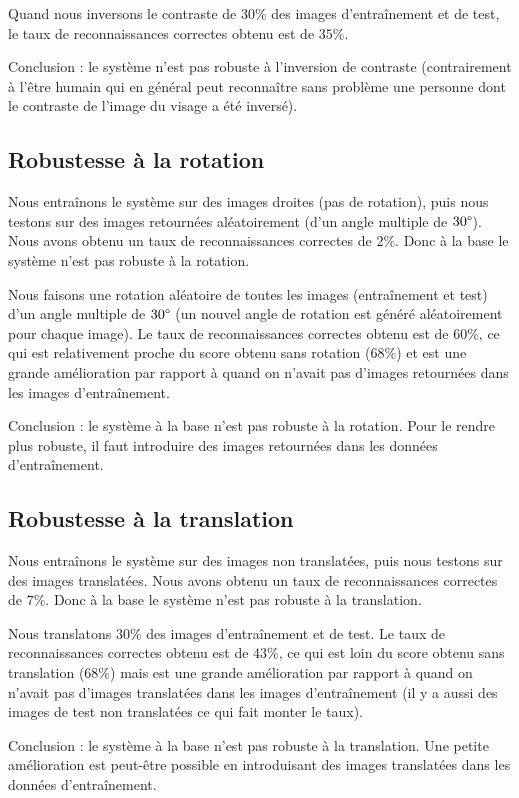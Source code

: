 Quand nous inversons le contraste de $30\%$ des images d'entraînement et de test, le taux de
reconnaissances correctes obtenu est de $35\%$.

Conclusion : le système n'est pas robuste à l'inversion de contraste (contrairement à l’être
humain qui en général peut reconnaître sans problème une personne dont le contraste de l'image
du visage a été inversé).


\subsection{Robustesse à la rotation}
Nous entraînons le système sur des images droites (pas de rotation), puis nous testons sur des images
retournées aléatoirement (d'un angle multiple de $30\degree$). Nous avons obtenu un taux de
reconnaissances correctes de $2\%$. Donc à la base le système n'est pas robuste à la rotation.

Nous faisons une rotation aléatoire de toutes les images (entraînement et test) d'un angle
multiple de $30\degree$ (un nouvel   angle de rotation est généré aléatoirement pour chaque
image). Le taux de reconnaissances correctes obtenu est de $60\%$, ce qui est relativement
proche du score obtenu sans rotation ($68\%$) et est une grande amélioration par rapport à
quand on n'avait pas d'images retournées dans les images d'entraînement.

Conclusion : le système à la base n'est pas robuste à la rotation. Pour le rendre plus robuste,
il faut introduire des images retournées dans les données d'entraînement.


\subsection{Robustesse à la translation}
Nous entraînons le système sur des images non translatées, puis nous testons sur des images
translatées. Nous avons obtenu un taux de
reconnaissances correctes de $7\%$. Donc à la base le système n'est pas robuste à la translation.

Nous translatons $30\%$ des images d'entraînement et de test. 
Le taux de reconnaissances correctes obtenu est de $43\%$, ce qui est loin
du score obtenu sans translation ($68\%$) mais est une grande amélioration par rapport à
quand on n'avait pas d'images translatées dans les images d'entraînement (il y a aussi
des images de test non translatées ce qui fait monter le taux).

Conclusion : le système à la base n'est pas robuste à la translation. Une petite amélioration est
peut-être possible en introduisant des images translatées dans les données d'entraînement.